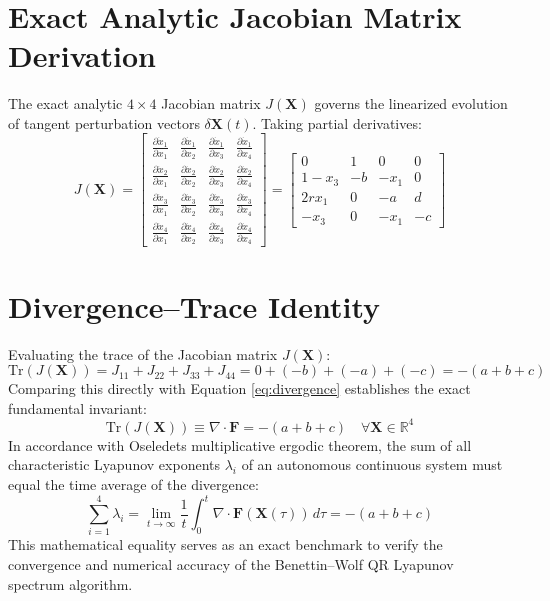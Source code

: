 \documentclass[12pt,a4paper,oneside]{report}
\begin{document}
\section{Exact Analytic Jacobian Matrix Derivation}
The exact analytic $4 \times 4$ Jacobian matrix $J(\mathbf{X})$ governs the linearized evolution of tangent perturbation vectors $\delta \mathbf{X}(t)$. Taking partial derivatives:
\begin{equation}
    J(\mathbf{X}) = \begin{bmatrix}
    \frac{\partial \dot{x}_1}{\partial x_1} & \frac{\partial \dot{x}_1}{\partial x_2} & \frac{\partial \dot{x}_1}{\partial x_3} & \frac{\partial \dot{x}_1}{\partial x_4} \\[6pt]
    \frac{\partial \dot{x}_2}{\partial x_1} & \frac{\partial \dot{x}_2}{\partial x_2} & \frac{\partial \dot{x}_2}{\partial x_3} & \frac{\partial \dot{x}_2}{\partial x_4} \\[6pt]
    \frac{\partial \dot{x}_3}{\partial x_1} & \frac{\partial \dot{x}_3}{\partial x_2} & \frac{\partial \dot{x}_3}{\partial x_3} & \frac{\partial \dot{x}_3}{\partial x_4} \\[6pt]
    \frac{\partial \dot{x}_4}{\partial x_1} & \frac{\partial \dot{x}_4}{\partial x_2} & \frac{\partial \dot{x}_4}{\partial x_3} & \frac{\partial \dot{x}_4}{\partial x_4}
    \end{bmatrix} = \begin{bmatrix}
    0 & 1 & 0 & 0 \\
    1 - x_3 & -b & -x_1 & 0 \\
    2r x_1 & 0 & -a & d \\
    -x_3 & 0 & -x_1 & -c
    \end{bmatrix}
    \label{eq:jacobian_matrix}
\end{equation}

\section{Divergence--Trace Identity}
Evaluating the trace of the Jacobian matrix $J(\mathbf{X})$:
\begin{equation}
    \text{Tr}(J(\mathbf{X})) = J_{11} + J_{22} + J_{33} + J_{44} = 0 + (-b) + (-a) + (-c) = -(a + b + c)
\end{equation}
Comparing this directly with Equation \eqref{eq:divergence} establishes the exact fundamental invariant:
\begin{equation}
    \text{Tr}(J(\mathbf{X})) \equiv \nabla \cdot \mathbf{F} = -(a + b + c) \quad \forall \mathbf{X} \in \mathbb{R}^4
\end{equation}
In accordance with Oseledets multiplicative ergodic theorem, the sum of all characteristic Lyapunov exponents $\lambda_i$ of an autonomous continuous system must equal the time average of the divergence:
\begin{equation}
    \sum_{i=1}^4 \lambda_i = \lim_{t \to \infty} \frac{1}{t} \int_0^t \nabla \cdot \mathbf{F}(\mathbf{X}(\tau)) \, d\tau = -(a + b + c)
\end{equation}
This mathematical equality serves as an exact benchmark to verify the convergence and numerical accuracy of the Benettin--Wolf QR Lyapunov spectrum algorithm.
\end{document}
